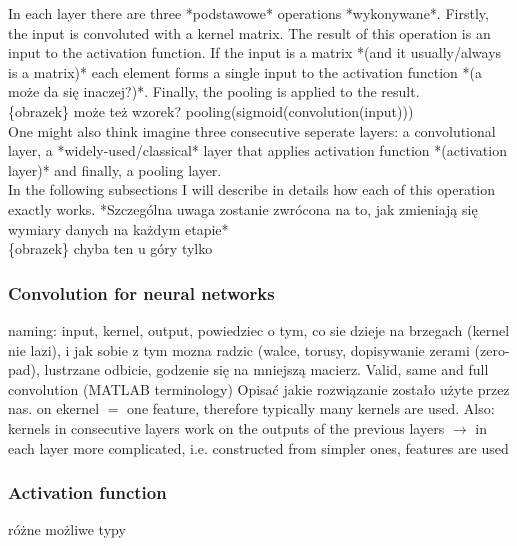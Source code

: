 \documentclass[a4paper,10pt]{report}
\begin{document}
	In each layer there are three *podstawowe* operations *wykonywane*. Firstly, the input is convoluted with a kernel matrix. The result of this operation is an input to the activation function. If the input is a matrix *(and it usually/always is a matrix)* each element forms a single input to the activation function *(a może da się inaczej?)*. Finally, the pooling is applied to the result. \\
	
	\{obrazek\}  może też wzorek? pooling(sigmoid(convolution(input))) \\
	
	One might also think imagine three consecutive seperate layers: a convolutional layer, a *widely-used/classical* layer that applies activation function *(activation layer)* and finally, a pooling layer.\\
	
	In the following subsections I will describe in details how each of this operation exactly works. *Szczególna uwaga zostanie zwrócona na to, jak zmieniają się wymiary danych na każdym etapie*\\
	
	\{obrazek\} chyba ten u góry tylko
	
	\subsubsection{Convolution for neural networks}%
	  naming: input, kernel, output,  powiedziec o tym, co sie dzieje na brzegach (kernel nie lazi),  i jak sobie z tym mozna radzic (walce, torusy, dopisywanie zerami (zero-pad), lustrzane odbicie, godzenie się na mniejszą macierz. Valid, same and full convolution (MATLAB terminology) Opisać jakie rozwiązanie zostało użyte przez nas. on ekernel $=$ one feature, therefore typically many kernels are used. Also: kernels in consecutive layers work on the outputs of the previous layers $\rightarrow$ in each layer more complicated, i.e. constructed from simpler ones, features are used
	
	\subsubsection{Activation function} %
	  różne możliwe typy
	
\end{document}
